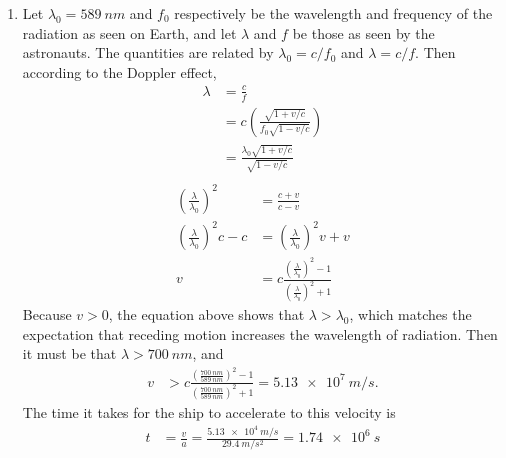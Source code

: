 \documentclass[a4paper,12pt]{article}
\begin{document}
\begin{enumerate}
    \item Let $\lambda_0 = \SI{589}{nm}$ and $f_0$ respectively be the wavelength and frequency of the radiation as seen on Earth, and let $\lambda$ and $f$ be those as seen by the astronauts. The quantities are related by $\lambda_0 = c/f_0$ and $\lambda = c/f$. Then according to the Doppler effect,
    \begin{align*}
        \lambda &= \frac{c}{f} \\
                &= c \left( \frac{\sqrt{1 + v/c}}{f_0 \sqrt{1 - v/c}} \right) \\
                &= \frac{\lambda_0 \sqrt{1 + v/c}}{\sqrt{1 - v/c}} \\
    \end{align*}
    \begin{align*}
        \left( \frac{\lambda}{\lambda_0} \right)^2 &= \frac{c + v}{c - v} \\
        \left( \frac{\lambda}{\lambda_0} \right)^2 c - c &=
            \left( \frac{\lambda}{\lambda_0} \right)^2 v + v \\ 
        v &= c \frac{\left( \frac{\lambda}{\lambda_0} \right)^2 - 1}
            {\left( \frac{\lambda}{\lambda_0} \right)^2 + 1} 
    \end{align*}
    Because $v > 0$, the equation above shows that $\lambda > \lambda_0$, which matches the expectation that receding motion increases the wavelength of radiation. Then it must be that $\lambda > \SI{700}{nm}$, and
    \begin{align*}
        v &> c \frac{\left( \frac{\SI{700}{nm}}{\SI{589}{nm}} \right)^2 - 1}
            {\left( \frac{\SI{700}{nm}}{\SI{589}{nm}} \right)^2 + 1} 
            = \SI{5.13e7}{m/s}.
    \end{align*}
    The time it takes for the ship to accelerate to this velocity is
    \begin{align*}
        t &= \frac{v}{a} = \frac{\SI{5.13e4}{m/s}}{\SI{29.4}{m/s^2}} = \SI{1.74e6}{s}
    \end{align*}
	
\end{enumerate}
\end{document}
